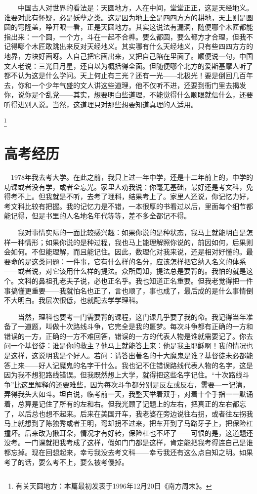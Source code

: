 　　中国古人对世界的看法是：天圆地方，人在中间，堂堂正正，这是天经地义。谁要对此有怀疑，必是妖孽之类。这是因为地上全是四四方方的耕地，天上则是圆圆的穹隆盖，睁开眼一看，正是天圆地方。其实这说法有漏洞，随便哪个木匠都能指出来：一个圆，一个方，斗在一起不合榫。要么都圆，要么都方才合理，但我不记得哪个木匠敢跳出来反对天经地义。其实哪有什么天经地义，只有些四四方方的地界，方块好画呀。人自己把它画出来，又把自己陷在里面了。顺便说一句，中国文人老说：三光日月星，还自以为概括得全面。但随便哪个北方的爱斯基摩人听了都不认为这是什么学问。天上何止有三光？还有一光——北极光！要是倒回几百年去，你和一个少年气盛的文人讲这些道理，他不仅听不进，还要到衙门里去揭发你，说你是个乱党——其实，想要明白些道理，不能觉得什么顺眼就信什么，还要听得进别人说。当然，这道理只对那些想要知道真理的人适用。

\footnote{有关天圆地方：本篇最初发表于1996年12月20日《南方周末》。}

\chapter{高考经历}

　1978年我去考大学。在此之前，我只上过一年中学，还是十二年前上的，中学的功课或者没有学，或者全忘光。家里人劝我说：你毫无基础，最好还是考文科，免得考不上。但我就是不听，去考了理科，结果考上了。家里人还说，你记忆力好，考文科比较有把握。我的记忆力是不错，一本很厚的书看过以后，里面每个细节都能记得，但是书里的人名地名年代等等，差不多全都记不得。

　　我对事情实际的一面比较感兴趣：如果你说的是种状态，我马上就能明白是怎样一种情形；如果你说的是种过程，我也马上能理解照你说的，前因如何，后果则会如何。不但能理解，而且能记住。因此，数理化对我来说，还是相对好懂的。最要命的是这类问题：一件事，它有什么样的名分，应该怎样把它纳入名义的体系——或者说，对它该用什么样的提法。众所周知，提法总是要背的。我怕的就是这个。文科的鼻祖孔老夫子说，必也正名乎。我也知道正名重要。但我老觉得把一件事搞懂更重要——我就怕名也正了，言也顺了，事也成了，最后成的是什么事情倒不大明白。我层次很低，也就配去学学理科。

　　当然，理科也要考一门需要背的课程，这门课几乎要了我的命。我记得当年准备了一道题，叫做十次路线斗争，它完全是我的噩梦。每次斗争都有正确的一方和错误的一方，正确的一方不难回答，错误的一方的代表人物是谁就需要记了。你去问一个基督徒：谁是你的救主？他马上就能答上来：他是我主耶稣啊！我的情况也是这样，这说明我是个好人。若问：请答出著名的十大魔鬼是谁？基督徒未必都能答上来——好人记魔鬼的名字干什么。我也记不住错误路线代表人物的名字，这是因为我不想犯路线错误。但我既然想上大学，就得把这些名字记住。“十次路线斗争”比这里解释的还要难些，因为每次斗争都分别是反左或反右，需要—一记清，弄得我头大如斗。坦白说，临考前一天，我整天举着双手，对着十个手指一一默诵着，总算是记住了所有的左和右。但我光顾了记题上的左右，把真正的左右都忘了，以后总也想不起来。后来在美国开车，我老婆在旁边说往右拐，或者往左拐我马上就想到了陈独秀或者王明，弯却拐不过来，把车开到了马路牙子上，把保险杠撞坏。后来改为揪耳朵，情况才有好转，保险杠也不坏了——可恨的是，这道题还没考。一门课就把我考成了这样，假如门门都是这样，肯定能把我考得连自己是谁都忘掉。现在回想起来，幸亏我没去考文科——幸亏我还有这么点自知之明。如果考了的话，要么考不上，要么被考傻掉。

